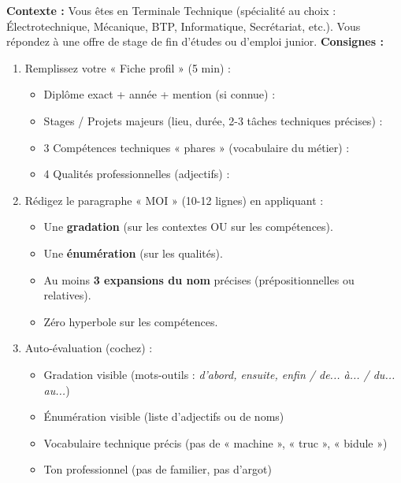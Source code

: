 \documentclass[11pt]{article}
\begin{document}
\begin{exercice}
\textbf{Contexte :} Vous êtes en Terminale Technique (spécialité au choix : Électrotechnique, Mécanique, BTP, Informatique, Secrétariat, etc.). Vous répondez à une offre de stage de fin d'études ou d'emploi junior.
\textbf{Consignes :}
\begin{enumerate}
    \item Remplissez votre « Fiche profil » (5 min) :
    \begin{itemize}
        \item Diplôme exact + année + mention (si connue) :
        \item Stages / Projets majeurs (lieu, durée, 2-3 tâches techniques précises) :
        \item 3 Compétences techniques « phares » (vocabulaire du métier) :
        \item 4 Qualités professionnelles (adjectifs) :
    \end{itemize}
    \item Rédigez le paragraphe « MOI » (10-12 lignes) en appliquant :
    \begin{itemize}
        \item Une \textbf{gradation} (sur les contextes OU sur les compétences).
        \item Une \textbf{énumération} (sur les qualités).
        \item Au moins \textbf{3 expansions du nom} précises (prépositionnelles ou relatives).
        \item Zéro hyperbole sur les compétences.
    \end{itemize}
    \item Auto-évaluation (cochez) :
    \begin{itemize}
        \item [ ] Gradation visible (mots-outils : \textit{d'abord, ensuite, enfin / de... à... / du... au...})
        \item [ ] Énumération visible (liste d'adjectifs ou de noms)
        \item [ ] Vocabulaire technique précis (pas de « machine », « truc », « bidule »)
        \item [ ] Ton professionnel (pas de familier, pas d'argot)
    \end{itemize}
\end{enumerate}
\end{exercice}
\end{document}
